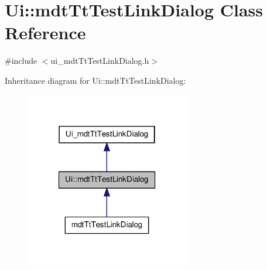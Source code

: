 \hypertarget{class_ui_1_1mdt_tt_test_link_dialog}{\section{Ui\-:\-:mdt\-Tt\-Test\-Link\-Dialog Class Reference}
\label{class_ui_1_1mdt_tt_test_link_dialog}
}


{\ttfamily \#include $<$ui\-\_\-mdt\-Tt\-Test\-Link\-Dialog.\-h$>$}



Inheritance diagram for Ui\-:\-:mdt\-Tt\-Test\-Link\-Dialog\-:\nopagebreak
\begin{figure}[H]
\begin{center}
\leavevmode
\includegraphics[width=202pt]{class_ui_1_1mdt_tt_test_link_dialog__inherit__graph}
\end{center}
\end{figure}



